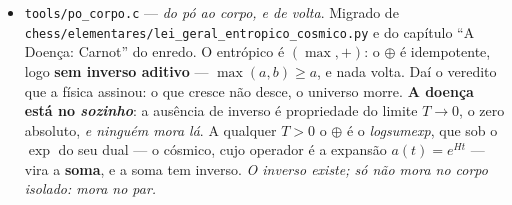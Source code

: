 \documentclass[11pt]{article}
\newcommand{\code}[1]{\texttt{\small #1}}
\newcommand{\Q}{\mathbb Q}
\theoremstyle{plain}
\theoremstyle{remark}
\begin{document}
\begin{itemize}
Donde \textbf{Kelvin, sem se falar de calor}: com um reservatório não há trabalho. E há
\emph{duas} maneiras de não o haver, por razões \textbf{distintas} --- em $\Delta=-4$ (o círculo)
o ciclo fecha mas os focos coincidem; em $\Delta=0$ (o parabólico) há dois focos mas o ciclo não
fecha. A janela do trabalho é o intervalo \textbf{aberto} $-4 < \Delta < 0$, aberto nos dois
extremos. E o círculo ser estéril é o vácuo estéril outra vez, pelo lado da máquina: simétrico
demais para ter área útil.

\emph{O que não medi, e fica anotado como candidato:} a razão das distâncias focais
$(1-e)/(1+e)$ é exata em $\Q$ e tem o comportamento certo para $T_f/T_q$ --- vai de $1$ em $e=0$
(reservatórios iguais, rendimento zero) a $0$ em $e=1$. \textbf{Mas não medi que seja isso.} Não há
termodinâmica aqui: há uma cónica e uma razão com o mesmo formato. O que testaria isto seria
derivar $\eta$ de $\oint$, e não de semelhança de forma.
\item \code{tools/po\_corpo.c} --- \emph{do pó ao corpo, e de volta}. Migrado de
\code{chess/elementares/lei\_geral\_entropico\_cosmico.py} e do capítulo ``A Doença: Carnot'' do
enredo. O entrópico é $(\max,+)$: o $\oplus$ é idempotente, logo \textbf{sem inverso aditivo} ---
$\max(a,b) \ge a$, e nada volta. Daí o veredito que a física assinou: o que cresce não desce, o
universo morre. \textbf{A doença está no \emph{sozinho}}: a ausência de inverso é propriedade do
limite $T\to0$, o zero absoluto, \emph{e ninguém mora lá}. A qualquer $T>0$ o $\oplus$ é o
\emph{logsumexp}, que sob o $\exp$ do seu dual --- o cósmico, cujo operador é a expansão
$a(t)=e^{Ht}$ --- vira a \textbf{soma}, e a soma tem inverso. \emph{O inverso existe; só não mora
no corpo isolado: mora no par.}


\end{itemize}
\end{document}

